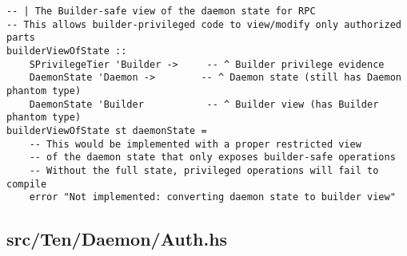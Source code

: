 \documentclass{article}
\begin{document}
\begin{tcolorbox}[title=Ten/Daemon/State.hs Changes]
\begin{verbatim}
-- | The Builder-safe view of the daemon state for RPC
-- This allows builder-privileged code to view/modify only authorized parts
builderViewOfState ::
    SPrivilegeTier 'Builder ->     -- ^ Builder privilege evidence
    DaemonState 'Daemon ->        -- ^ Daemon state (still has Daemon phantom type)
    DaemonState 'Builder           -- ^ Builder view (has Builder phantom type)
builderViewOfState st daemonState =
    -- This would be implemented with a proper restricted view
    -- of the daemon state that only exposes builder-safe operations
    -- Without the full state, privileged operations will fail to compile
    error "Not implemented: converting daemon state to builder view"
\end{verbatim}
\end{tcolorbox}

\subsection{src/Ten/Daemon/Auth.hs}
\end{document}
